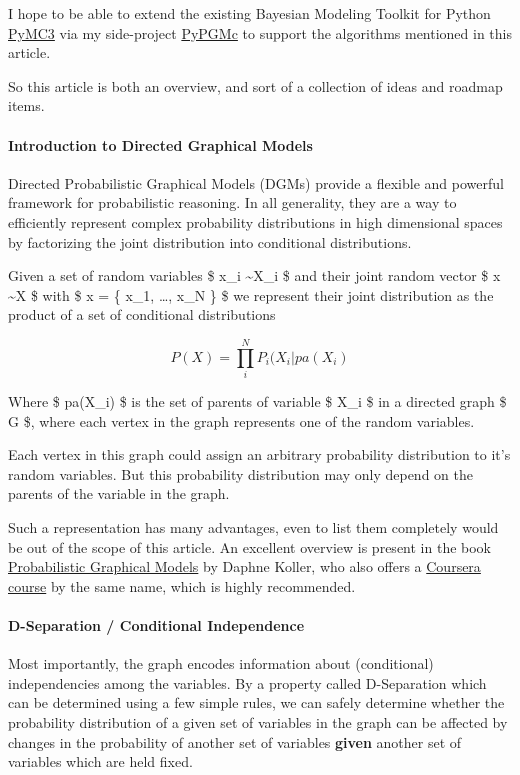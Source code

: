 I hope to be able to extend the existing Bayesian Modeling Toolkit for
Python \href{https://github.com/pymc-devs/pymc}{PyMC3} via my
side-project \href{https://github.com/kadeng/pypgmc}{PyPGMc} to support
the algorithms mentioned in this article.

So this article is both an overview, and sort of a collection of ideas
and roadmap items.

\paragraph{Introduction to Directed Graphical Models}

Directed Probabilistic Graphical Models (DGMs) provide a flexible and
powerful framework for probabilistic reasoning. In all generality, they
are a way to efficiently represent complex probability distributions in
high dimensional spaces by factorizing the joint distribution into
conditional distributions.

Given a set of random variables \$ x\_i \sim X\_i \$ and their joint
random vector \$ x \sim X \$ with \$ x = \{ x\_1, \ldots, x\_N \} \$ we
represent their joint distribution as the product of a set of
conditional distributions

\[
P(X) = \prod_i^N P_i(X_i|{pa}(X_i)
\]

Where \$ pa(X\_i) \$ is the set of parents of variable \$ X\_i \$ in a
directed graph \$ G \$, where each vertex in the graph represents one of
the random variables.

Each vertex in this graph could assign an arbitrary probability
distribution to it's random variables. But this probability distribution
may only depend on the parents of the variable in the graph.

Such a representation has many advantages, even to list them completely
would be out of the scope of this article. An excellent overview is
present in the book
\href{http://mitpress.mit.edu/books/probabilistic-\%20graphical-models}{Probabilistic
Graphical Models} by Daphne Koller, who also offers a
\href{https://www.coursera.org/course/pgm}{Coursera course} by the same
name, which is highly recommended.

\paragraph{D-Separation / Conditional Independence}

Most importantly, the graph encodes information about (conditional)
independencies among the variables. By a property called D-Separation
which can be determined using a few simple rules, we can safely
determine whether the probability distribution of a given set of
variables in the graph can be affected by changes in the probability of
another set of variables \textbf{given} another set of variables which
are held fixed.

